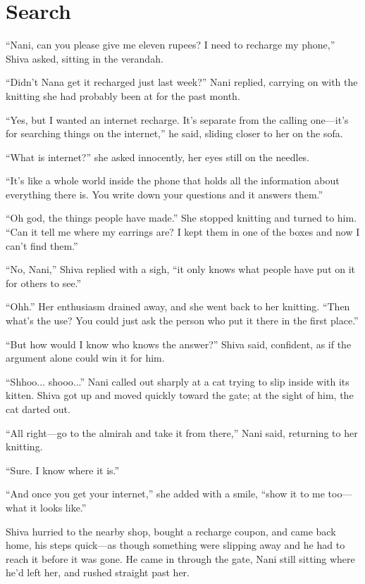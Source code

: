 \chapter{Search}

``Nani, can you please give me eleven rupees? I need to recharge my phone,'' Shiva asked, sitting in the verandah.

``Didn't Nana get it recharged just last week?'' Nani replied, carrying on with the knitting she had probably been at for the past month.

``Yes, but I wanted an internet recharge. It's separate from the calling one—it's for searching things on the internet,'' he said, sliding closer to her on the sofa.

``What is internet?'' she asked innocently, her eyes still on the needles.

``It's like a whole world inside the phone that holds all the information about everything there is. You write down your questions and it answers them.''

``Oh god, the things people have made.'' She stopped knitting and turned to him. ``Can it tell me where my earrings are? I kept them in one of the boxes and now I can't find them.''

``No, Nani,'' Shiva replied with a sigh, ``it only knows what people have put on it for others to see.''

``Ohh.'' Her enthusiasm drained away, and she went back to her knitting. ``Then what's the use? You could just ask the person who put it there in the first place.''

``But how would I know who knows the answer?'' Shiva said, confident, as if the argument alone could win it for him.

``Shhoo... shooo...'' Nani called out sharply at a cat trying to slip inside with its kitten. Shiva got up and moved quickly toward the gate; at the sight of him, the cat darted out.

``All right—go to the almirah and take it from there,'' Nani said, returning to her knitting.

``Sure. I know where it is.''

``And once you get your internet,'' she added with a smile, ``show it to me too—what it looks like.''

Shiva hurried to the nearby shop, bought a recharge coupon, and came back home, his steps quick—as though something were slipping away and he had to reach it before it was gone. He came in through the gate, Nani still sitting where he'd left her, and rushed straight past her.

